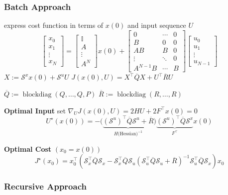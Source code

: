 \subsubsection{Batch Approach}

express cost function in terms of $x(0)$ and input sequence $U$
%
\[ \begin{bmatrix}
		x_0    \\
		x_1    \\
		\vdots \\
		x_N
	\end{bmatrix}
	=
	\begin{bmatrix}
		\mathbb{I} \\
		A          \\
		\vdots     \\
		A^N
	\end{bmatrix}
	x(0) +
	\begin{bmatrix}
		0        & \cdots & 0 \\
		B        & 0      & 0 \\
		AB       & B      & 0 \\
		\vdots   & \ddots & 0 \\
		A^{N-1}B & \cdots & B
	\end{bmatrix}
	\begin{bmatrix}
		u_0    \\
		u_1    \\
		\vdots \\
		u_{N-1}
	\end{bmatrix} \]
%
$X:=\mathcal{S}^x x(0) + \mathcal{S}^u U$
\quad
$J(x(0),U) =
	X^\top \overline{Q}X
	+ U^\top \overline{R}U$

$\overline{Q} := \mathop{\mathrm{blockdiag}}(Q,\dots, Q,P)$
\quad
$\overline{R} := \mathop{\mathrm{blockdiag}}(R,\dots, R)$

\textbf{Optimal Input}
set $\nabla_UJ(x(0),U)=2HU+2F^\top x(0)=0$
\[ U^\star(x(0)) =
	- \bigl(
	\underbrace{
			(\mathcal{S}^u)^\top \overline{Q} \mathcal{S}^u + \overline{R}
		}_{H\text{(Hessian)}^{-1}}
	\bigr)
	\underbrace{
		(\mathcal{S}^u)^\top \overline{Q}\mathcal{S}^x
	}_ {F^\top}
	x(0)
\]

\textbf{Optimal Cost}
$(x_0=x(0))$
\[
	\scriptstyle
	J^\star(x_0) = x_0^\top (
	\mathcal{S}_x^\top \overline{Q} \mathcal{S}_x
	- \mathcal{S}_x^\top \overline{Q} \mathcal{S}_u
	(\mathcal{S}_u^\top \overline{Q} \mathcal{S}_u
	+ \overline{R})^{-1}
	\mathcal{S}_u^\top \overline{Q} \mathcal{S}_x
	)x_0
\]

\subsubsection{Recursive Approach}

